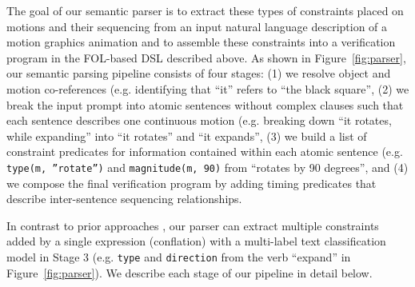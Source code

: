 The goal of our semantic parser is to extract these types of
constraints placed on motions and their sequencing from an input
natural language description of a motion graphics animation and to
assemble these constraints into a verification program in the
FOL-based DSL described above.
%
%
As shown in Figure~\ref{fig:parser}, our semantic parsing pipeline
consists of four stages: (1) we resolve object and motion
co-references (e.g. identifying that ``it'' refers to ``the black
square'', (2) we break the input prompt into atomic sentences
without complex clauses such that each sentence describes one
continuous motion (e.g. breaking down ``it rotates, while expanding''
into ``it rotates'' and ``it expands'', (3) we build a list of
constraint predicates for information contained within each atomic
sentence (e.g. \texttt{type(m, ''rotate'')} and \texttt{magnitude(m,
  90)} from ``rotates by 90 degrees'', and (4) we compose the final
verification program by adding timing predicates that describe
inter-sentence sequencing relationships.

In contrast to prior approaches , our parser can extract multiple
constraints added by a single expression (conflation) with a
multi-label text classification model in Stage 3 (e.g. \texttt{type}
and \texttt{direction} from the verb ``expand'' in
Figure~\ref{fig:parser}).  We describe each stage of our pipeline in
detail below. 

